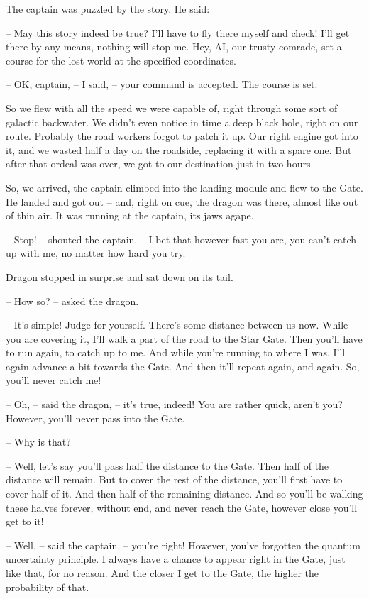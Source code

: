 \documentclass[ebook,twoside,final,openright]{memoir}
\begin{document}
\par
The captain was puzzled by the story. He said:\par
– May this story indeed be true? I’ll have to fly there myself and check! I'll get there by any means, nothing will stop me. Hey, AI, our trusty comrade, set a course for the lost world at the specified coordinates.\par
– OK, captain, – I said, – your command is accepted. The course is set.\par
So we flew with all the speed we were capable of, right through some sort of galactic backwater. We didn’t even notice in time a deep black hole, right on our route. Probably the road workers forgot to patch it up. Our right engine got into it, and we wasted half a day on the roadside, replacing it with a spare one. But after that ordeal was over, we got to our destination just in two hours.\par
\par
So, we arrived, the captain climbed into the landing module and flew to the Gate. He landed and got out – and, right on cue, the dragon was there, almost like out of thin air. It was running at the captain, its jaws agape.\par
– Stop! – shouted the captain. – I bet that however fast you are, you can’t catch up with me, no matter how hard you try.\par
Dragon stopped in surprise and sat down on its tail.\par
– How so? – asked the dragon.\par
– It’s simple! Judge for yourself. There’s some distance between us now. While you are covering it, I’ll walk a part of the road to the Star Gate. Then you’ll have to run again, to catch up to me. And while you’re running to where I was, I’ll again advance a bit towards the Gate. And then it’ll repeat again, and again. So, you’ll never catch me!\par
– Oh, – said the dragon, – it’s true, indeed! You are rather quick, aren’t you? However, you’ll never pass into the Gate.\par
– Why is that?\par
– Well, let’s say you’ll pass half the distance to the Gate. Then half of the distance will remain. But to cover the rest of the distance, you’ll first have to cover half of it. And then half of the remaining distance. And so you’ll be walking these halves forever, without end, and never reach the Gate, however close you’ll get to it!\par
– Well, – said the captain, – you’re right! However, you’ve forgotten the quantum uncertainty principle. I always have a chance to appear right in the Gate, just like that, for no reason. And the closer I get to the Gate, the higher the probability of that.\par
\end{document}
